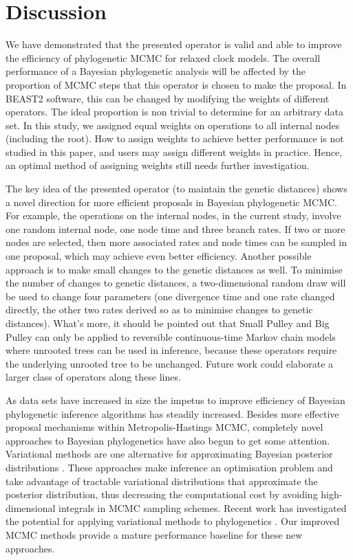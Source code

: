 \documentclass{bmcart}
\begin{document}
\section*{Discussion}
We have demonstrated that the presented operator is valid and able to improve the efficiency of phylogenetic MCMC for relaxed clock models. The overall performance of a Bayesian phylogenetic analysis will be affected by the proportion of MCMC steps that this operator is chosen to make the proposal. In BEAST2 software, this can be changed by modifying the weights of different operators. The ideal proportion is non trivial to determine for an arbitrary data set. In this study, we assigned equal weights on operations to all internal nodes (including the root). How to assign weights to achieve better performance is not studied in this paper, and users may assign different weights in practice. Hence, an optimal method of assigning weights still needs further investigation. 

The key idea of the presented operator (to maintain the genetic distances) shows a novel direction for more efficient proposals in Bayesian phylogenetic MCMC. For example, the operations on the internal nodes, in the current study, involve one random internal node, one node time and three branch rates. If two or more nodes are selected, then more associated rates and node times can be sampled in one proposal, which may achieve even better efficiency. Another possible approach is to make small changes to the genetic distances as well. To minimise the number of changes to genetic distances, a two-dimensional random draw will be used to change four parameters (one divergence time and one rate changed directly, the other two rates derived so as to minimise changes to genetic distances). What's more, it should be pointed out that Small Pulley and Big Pulley can only be applied to reversible continuous-time Markov chain models where unrooted trees can be used in inference, because these operators require the underlying unrooted tree to be unchanged. Future work could elaborate a larger class of operators along these lines.

As data sets have increased in size the impetus to improve efficiency of Bayesian phylogenetic inference algorithms has steadily increased. Besides more effective proposal mechanisms within Metropolis-Hastings MCMC, completely novel approaches to Bayesian phylogenetics have also begun to get some attention. Variational methods are one alternative for approximating Bayesian posterior distributions \cite{beal2003variational}. These approaches make inference an optimisation problem and take advantage of tractable variational distributions that approximate the posterior distribution, thus decreasing the computational cost by avoiding high-dimensional integrals in MCMC sampling schemes. Recent work has investigated the potential for applying variational methods to phylogenetics \cite{zhang2018variational,dang2019stochastic}. Our improved MCMC methods provide a mature performance baseline for these new approaches.
\end{document}
